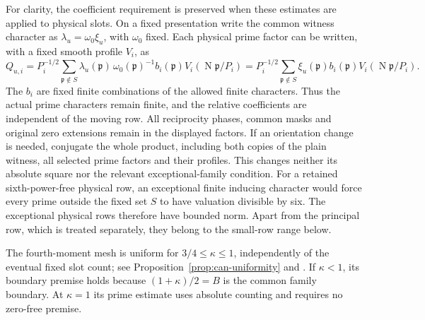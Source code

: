 \documentclass[11pt,a4paper]{article}
\numberwithin{equation}{section}
\theoremstyle{definition}
\theoremstyle{remark}
\newcommand{\Norm}{\operatorname{N}}
\begin{document}
For clarity, the coefficient requirement is preserved when these
estimates are applied to physical slots.  On a fixed presentation write
the common witness character as
\(\lambda_u=\omega_0\xi_u\), with \(\omega_0\) fixed.  Each physical prime
factor can be written, with a fixed smooth profile \(V_i\), as
\begin{equation}\label{row:common-coefficients}
 Q_{u,i}
 =P_i^{-1/2}\sum_{\mathfrak p\notin S}
   \lambda_u(\mathfrak p)\,
   \omega_0(\mathfrak p)^{-1}b_i(\mathfrak p)
   V_i(\Norm\mathfrak p/P_i)
 =P_i^{-1/2}\sum_{\mathfrak p\notin S}
   \xi_u(\mathfrak p)b_i(\mathfrak p)
   V_i(\Norm\mathfrak p/P_i).
\end{equation}
The \(b_i\) are fixed finite combinations of the allowed finite
characters.  Thus the actual prime characters remain finite, and the
relative coefficients are independent of the moving row.  All
reciprocity phases, common masks and original zero extensions remain
in the displayed factors.  If an orientation change is needed, conjugate
the whole product, including both copies of the plain witness, all
selected prime factors and their profiles.  This changes neither its
absolute square nor the relevant exceptional-family condition.
For a retained sixth-power-free physical row, an exceptional finite
inducing character would force every prime outside the fixed set \(S\)
to have valuation divisible by six.  The exceptional physical rows
therefore have bounded norm.  Apart from the principal row, which is
treated separately, they belong to the small-row range below.

The fourth-moment mesh is uniform for
\(3/4\le\kappa\le1\), independently of the eventual fixed slot count;
see Proposition~\ref{prop:can-uniformity} and
\cite[Lemma 18.1]{Q}.  If \(\kappa<1\), its boundary premise holds
because \((1+\kappa)/2=B\) is the common family boundary.  At
\(\kappa=1\) its prime estimate uses absolute counting and requires
no zero-free premise.
\end{document}

